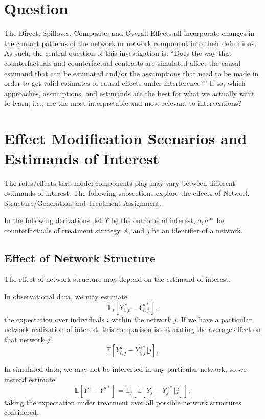 \documentclass{article}
\theoremstyle{definition}
\begin{document}
\section{Question}
The Direct, Spillover, Composite, and Overall Effects all incorporate changes in the contact patterns of the network or network component into their definitions. As such, the central question of this investigation is: ``Does the way that counterfactuals and counterfactual contrasts are simulated affect the causal estimand that can be estimated and/or the assumptions that need to be made in order to get valid estimates of causal effects under interference?''
If so, which approaches, assumptions, and estimands are the best for what we actually want to learn, i.e., are the most interpretable and most relevant to interventions?
\section{Effect Modification Scenarios and Estimands of Interest}
The roles/effects that model components play may vary between different estimands of interest. The following subsections explore the effects of Network Structure/Generation and Treatment Assignment. 

In the following derivations, let $Y$ be the outcome of interest, $a,a*$ be counterfactuals of treatment strategy $A$, and $j$ be an identifier of a network.
\subsection{Effect of Network Structure}
The effect of network structure may depend on the estimand of interest. 

In observational data, we may estimate
\begin{equation}\label{eq:1}
    \mathbb{E}_{i}\left[Y_{i,j}^{a}-Y_{i,j}^{a*}\right],
\end{equation}
the expectation over individuals $i$ within the network $j$. If we have a particular network realization of interest, this comparison is estimating the average effect on that network $j$: 
\begin{equation}\label{eq:2}
    \mathbb{E}\left[Y^{a}_{i,j}-Y^{a*}_{i,j}|j\right],
\end{equation}

In simulated data, we may not be interested in any particular network, so we instead estimate
\begin{equation}\label{eq:3}
    \mathbb{E}\left[Y^{a}-Y^{a*}\right]=\mathbb{E}_{j}\left[\mathbb{E}\left[Y_{j}^{a}-Y_{j}^{a*} \vert j\right]\right],
\end{equation}
taking the expectation under treatment over all possible network structures considered. 
\end{document}
